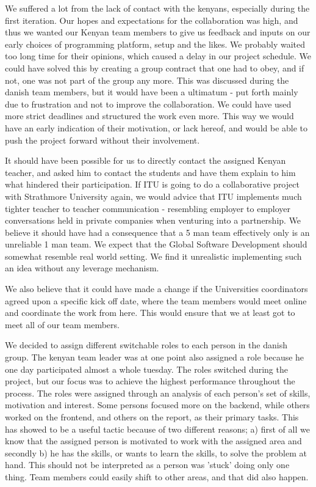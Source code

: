 We suffered a lot from the lack of contact with the kenyans, especially during the first iteration. Our hopes and expectations for the collaboration was high, and thus we wanted our Kenyan team members to give us feedback and inputs on our early choices of programming platform, setup and the likes. We probably waited too long time for their opinions, which caused a delay in our project schedule. We could have solved this by creating a group contract that one had to obey, and if not, one was not part of the group any more. This was discussed during the danish team members, but it would have been a ultimatum - put forth mainly due to frustration and not to improve the collaboration. We could have used more strict deadlines and structured the work even more. This way we would have an early indication of their motivation, or lack hereof, and would be able to push the project forward without their involvement. 

It should have been possible for us to directly contact the assigned Kenyan teacher, and asked him to contact the students and have them explain to him what hindered their participation. If ITU is going to do a collaborative project with Strathmore University again, we would advice that ITU implements much tighter teacher to teacher communication - resembling employer to employer conversations held in private companies when venturing into a partnership. We believe it should have had a consequence that a 5 man team effectively only is an unreliable 1 man team. We expect that the Global Software Development should somewhat resemble real world setting. We find it unrealistic implementing such an idea without any leverage mechanism.

We also believe that it could have made a change if the Universities coordinators agreed upon a specific kick off date, where the team members would meet online and coordinate the work from here. This would ensure that we at least got to meet all of our team members. 

We decided to assign different switchable roles to each person in the danish group. The kenyan team leader was at one point also assigned a role because he one day participated almost a whole tuesday. The roles switched during the project, but our focus was to achieve the highest performance throughout the process. The roles were assigned through an analysis of each person's set of skills, motivation and interest. Some persons focused more on the backend, while others worked on the frontend, and others on the report, as their primary tasks. This has showed to be a useful tactic because of two different reasons; a) first of all we know that the assigned person is motivated to work with the assigned area and secondly b) he has the skills, or wants to learn the skills, to solve the problem at hand. This should not be interpreted as a person was 'stuck' doing only one thing. Team members could easily shift to other areas, and that did also happen.


